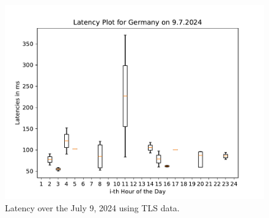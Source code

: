 \begin{figure}
	\includegraphics[width=\textwidth]{./chapters/appendix/img/latency_plot_for_germany_on_9.7.2024.pdf}
	\caption{Latency over the July 9, 2024 using TLS data.}
	\label{fig:tls-analysis-individual-day}
\end{figure}
